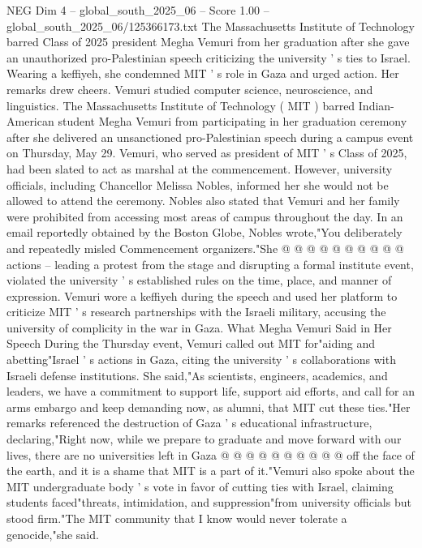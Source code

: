 \begin{textsample}{NEG Dim 4 – global\_south\_2025\_06 – Score 1.00 – global\_south\_2025\_06/125366173.txt}  \label{ex:f4_neg_106}
The Massachusetts Institute of Technology barred Class of 2025 president Megha Vemuri from her graduation after she gave an unauthorized pro-Palestinian speech criticizing the university ' s ties to Israel.
Wearing a keffiyeh, she condemned MIT ' s role in Gaza and urged action.
Her remarks drew cheers.
Vemuri studied computer science, neuroscience, and linguistics.
The Massachusetts Institute of Technology ( MIT ) barred Indian-American student Megha Vemuri from participating in her graduation ceremony after she delivered an unsanctioned pro-Palestinian speech during a campus event on Thursday, May 29.
Vemuri, who served as president of MIT ' s Class of 2025, had been slated to act as marshal at the commencement.
However, university officials, including Chancellor Melissa Nobles, informed her she would not be allowed to attend the ceremony.
Nobles also stated that Vemuri and her family were prohibited from accessing most areas of campus throughout the day.
In an email reportedly obtained by the Boston Globe, Nobles wrote,"You deliberately and repeatedly misled Commencement organizers."She @ @ @ @ @ @ @ @ @ @ actions -- leading a protest from the stage and disrupting a formal institute event, violated the university ' s established rules on the time, place, and manner of expression.
Vemuri wore a keffiyeh during the speech and used her platform to criticize MIT ' s research partnerships with the Israeli military, accusing the university of complicity in the war in Gaza.
What Megha Vemuri Said in Her Speech During the Thursday event, Vemuri called out MIT for"aiding and abetting"Israel ' s actions in Gaza, citing the university ' s collaborations with Israeli defense institutions.
She said,"As scientists, engineers, academics, and leaders, we have a commitment to support life, support aid efforts, and call for an arms embargo and keep demanding now, as alumni, that MIT cut these ties."Her remarks referenced the destruction of Gaza ' s educational infrastructure, declaring,"Right now, while we prepare to graduate and move forward with our lives, there are no universities left in Gaza @ @ @ @ @ @ @ @ @ @ off the face of the earth, and it is a shame that MIT is a part of it."Vemuri also spoke about the MIT undergraduate body ' s vote in favor of cutting ties with Israel, claiming students faced"threats, intimidation, and suppression"from university officials but stood firm."The MIT community that I know would never tolerate a genocide,"she said.

\end{textsample}
